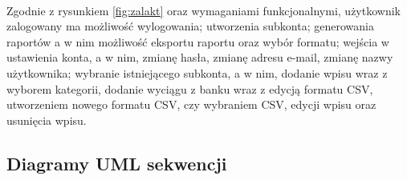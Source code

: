 \documentclass{article}
\begin{document}
	\paragraph*{} Zgodnie z rysunkiem \ref{fig:zalakt} oraz wymaganiami funkcjonalnymi, użytkownik zalogowany ma możliwość wylogowania; utworzenia subkonta; generowania raportów a w nim możliwość eksportu raportu oraz wybór formatu; wejścia w ustawienia konta, a w nim, zmianę hasła, zmianę adresu e-mail, zmianę nazwy użytkownika; wybranie istniejącego subkonta, a w nim, dodanie wpisu wraz z wyborem kategorii, dodanie wyciągu z banku wraz z edycją formatu CSV, utworzeniem nowego formatu CSV, czy wybraniem CSV, edycji wpisu oraz usunięcia wpisu.
	\subsection{Diagramy UML sekwencji}
\end{document}
